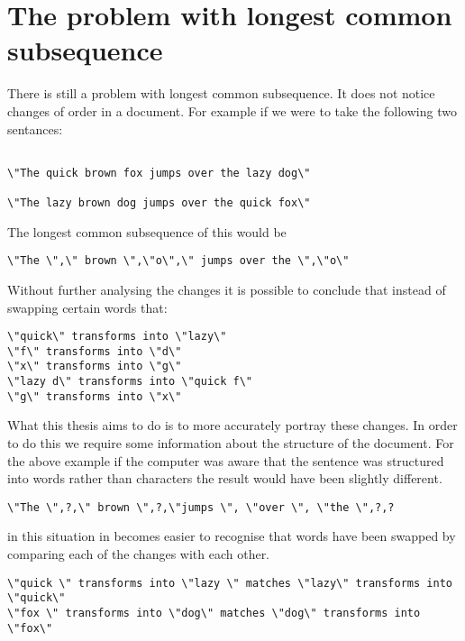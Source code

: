 \section{The problem with longest common subsequence}
There is still a problem with longest common subsequence. It does not notice changes of order in a document.  For example if we were to take the following two sentances:

\begin{verbatim}

\"The quick brown fox jumps over the lazy dog\"

\"The lazy brown dog jumps over the quick fox\"

\end{verbatim}

The longest common subsequence of this would be

\begin{verbatim}
\"The \",\" brown \",\"o\",\" jumps over the \",\"o\"
\end{verbatim}

Without further analysing the changes it is possible to conclude that instead of swapping certain words that:

\begin{verbatim}
\"quick\" transforms into \"lazy\"
\"f\" transforms into \"d\"
\"x\" transforms into \"g\"
\"lazy d\" transforms into \"quick f\"
\"g\" transforms into \"x\"
\end{verbatim}

What this thesis aims to do is to more accurately portray these changes.
In order to do this we require some information about the structure of the document.
For the above example if the computer was aware that the sentence was structured into words rather than characters the result would have been slightly different.

\begin{verbatim}
\"The \",?,\" brown \",?,\"jumps \", \"over \", \"the \",?,?
\end{verbatim}

in this situation in becomes easier to recognise that words have been swapped by comparing each of the changes with each other.  

\begin{verbatim}
\"quick \" transforms into \"lazy \" matches \"lazy\" transforms into \"quick\"
\"fox \" transforms into \"dog\" matches \"dog\" transforms into \"fox\" 
\end{verbatim}

